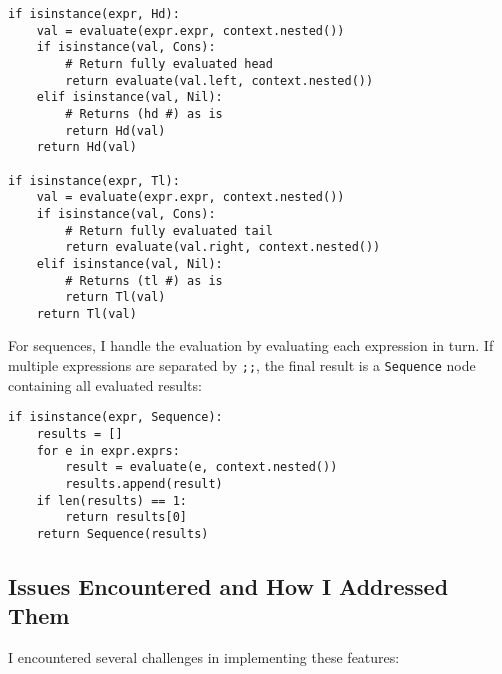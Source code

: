 \documentclass{article}
\theoremstyle{theorem}
\theoremstyle{definition}
\theoremstyle{remark}
\begin{document}
\begin{verbatim}
if isinstance(expr, Hd):
    val = evaluate(expr.expr, context.nested())
    if isinstance(val, Cons):
        # Return fully evaluated head
        return evaluate(val.left, context.nested())
    elif isinstance(val, Nil):
        # Returns (hd #) as is
        return Hd(val)
    return Hd(val)

if isinstance(expr, Tl):
    val = evaluate(expr.expr, context.nested())
    if isinstance(val, Cons):
        # Return fully evaluated tail
        return evaluate(val.right, context.nested())
    elif isinstance(val, Nil):
        # Returns (tl #) as is
        return Tl(val)
    return Tl(val)
\end{verbatim}

For sequences, I handle the evaluation by evaluating each expression in turn. If multiple expressions are separated by \texttt{;;}, the final result is a \texttt{Sequence} node containing all evaluated results:

\begin{verbatim}
if isinstance(expr, Sequence):
    results = []
    for e in expr.exprs:
        result = evaluate(e, context.nested())
        results.append(result)
    if len(results) == 1:
        return results[0]
    return Sequence(results)
\end{verbatim}

\subsection{Issues Encountered and How I Addressed Them}

I encountered several challenges in implementing these features:
\end{document}
